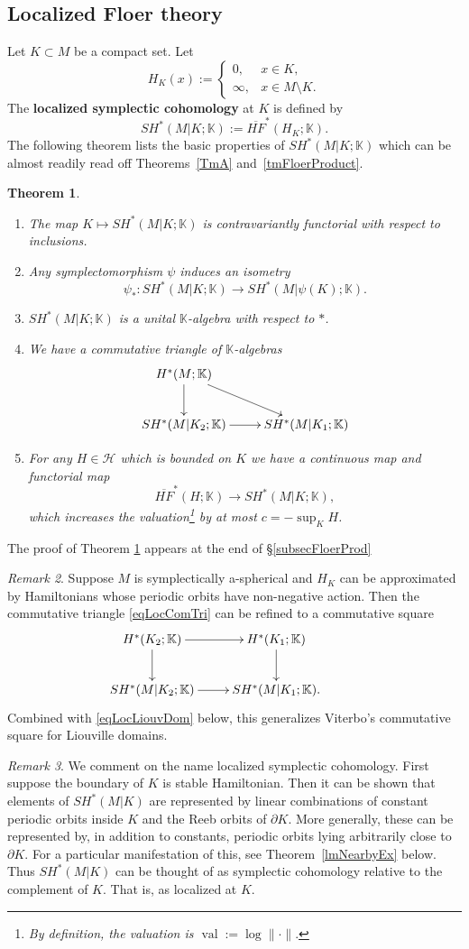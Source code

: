 \documentclass[11pt]{amsart}
\newcommand{\K}{\mathbb{K}}
\DeclareMathOperator{\val}{val}
\newtheorem{tm}{Theorem}[section]
\theoremstyle{definition}
\theoremstyle{remark}
\newtheorem{rem}[tm]{Remark}
\begin{document}
\subsection{Localized Floer theory}
Let $K\subset M$ be a compact set. Let
\[
H_K(x):=\begin{cases} 0, & x\in K,\\ \infty, & x\in M\setminus K.\end{cases}
\]
The \textbf{localized symplectic cohomology} at $K$ is defined by
\[
SH^*(M|K;\K):=\overline{HF}^*(H_K;\K).
\]
The following theorem lists the basic properties of $SH^*(M|K;\K)$ which can be almost readily read off Theorems~\ref{TmA} and~\ref{tmFloerProduct}.
\begin{tm}\label{tmLocFlHoProp}
\begin{enumerate}
\item The map $K\mapsto SH^*(M|K;\K)$ is contravariantly functorial with respect to inclusions.
\item Any symplectomorphism $\psi$ induces an isometry
    \[
    \psi_*:SH^*(M|K;\K)\to SH^*(M|\psi(K);\K).
    \]
\item $SH^*(M|K;\K)$ is a unital $\K$-algebra with respect to $*$.
\item We have a commutative triangle of $\K$-algebras
\[
\xymatrix{
H^*(M;\K)\ar[d]\ar[dr]& \\
SH^*(M|K_2;\K) \ar[r] &SH^*(M|K_1;\K)
}
\]
\item For any $H\in\mathcal{H}$ which is bounded on $K$ we have a continuous map and functorial map
\[
\overline{HF}^*(H;\K)\to SH^*(M|K;\K),
\]
which increases the valuation\footnote{By definition, the valuation is $\val:=\log\|\cdot\|.$} by at most $c=-\sup_KH$.
\end{enumerate}
\end{tm}
The proof of Theorem \ref{tmLocFlHoProp} appears at the end of \S\ref{subsecFloerProd}
\begin{rem}
Suppose $M$ is symplectically a-spherical and $H_K$ can be approximated by Hamiltonians whose periodic orbits have non-negative action. Then the commutative triangle \eqref{eqLocComTri} can be refined to a commutative square
\[
\xymatrix{
H^*(K_2;\K)\ar[d]\ar[r]&H^*(K_1;\K)\ar[d]& \\
SH^*(M|K_2;\K) \ar[r] &SH^*(M|K_1;\K).
}
\]
Combined with \eqref{eqLocLiouvDom} below, this generalizes Viterbo's commutative square for Liouville domains\cite{Viterbo99}.
\end{rem}
\begin{rem}
We comment on the name localized symplectic cohomology. First suppose the boundary of $K$ is stable Hamiltonian. Then it can be shown that elements of $SH^*(M|K)$ are represented by linear combinations of constant periodic orbits inside $K$ and the Reeb orbits of $\partial K$. More generally, these can be represented by, in addition to constants, periodic orbits lying arbitrarily close to $\partial K$. For a particular manifestation of this, see Theorem~\ref{lmNearbyEx} below. Thus $SH^*(M|K)$ can be thought of as symplectic cohomology relative to the complement of $K$. That is, as localized at $K$.
\end{rem}
\end{document}
